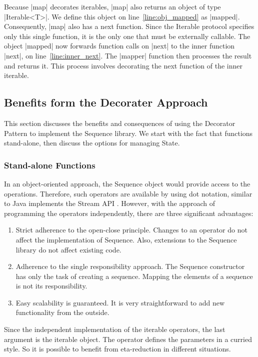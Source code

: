 Because |map| decorates iterables, |map| also returns an object of type |Iterable<T>|. 
We define this object on line~\ref{line:obj_mapped} as |mapped|. 
Consequently, |map| also has a next function. Since the Iterable protocol 
specifies only this single function, it is the only one that must be externally 
callable. The object |mapped| now forwards function calls on |next| to the
inner function |next|, on line~\ref{line:inner_next}. The |mapper| function then 
processes the result and returns it. This process involves decorating the next function of the inner iterable.

\subsection{Benefits form the Decorater Approach}
\label{sub:Benefits form the Decorater Approach}
This section discusses the benefits and consequences of using the Decorator 
Pattern to implement the Sequence library. We start with the fact that functions 
stand-alone, then discuss the options for managing State.

\subsubsection{Stand-alone Functions}
\label{subsub:Standalone Functions}
In an object-oriented approach, the Sequence object would provide access to the 
operations. Therefore, such operators are available by using dot notation,
similar to Java implements the Stream API \cite{java_stream}. 
However, with the approach of programming the operators independently, there 
are three significant advantages:

\begin{enumerate}
  \item {Strict adherence to the open-close principle. Changes to an operator do
      not affect the implementation of Sequence. Also, extensions to the 
      Sequence library do not affect existing code.
    }
  \item{Adherence to the single responsibility approach. The Sequence 
      constructor has only the task of creating a sequence. Mapping the
    elements of a sequence is not its responsibility.
  }
  \item{Easy scalability is guaranteed. It is very straightforward to add new 
    functionality from the outside.
  }
\end{enumerate}

Since the independent implementation of the iterable operators, the last
argument is the iterable object. The operator defines the 
parameters in a curried style. So it is possible to benefit from eta-reduction 
in different situations.

